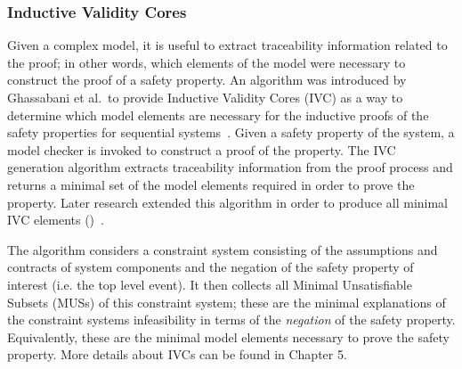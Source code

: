 \subsubsection{Inductive Validity Cores} Given a complex model, it is useful to extract traceability information related to the proof; in other words, which elements of the model were necessary to construct the proof of a safety property. An algorithm was introduced by Ghassabani et al.~to provide Inductive Validity Cores (IVC) as a way to determine which model elements are necessary for the inductive proofs of the safety properties for sequential systems~\cite{GhassabaniGW16}. Given a safety property of the system, a model checker is invoked to construct a proof of the property. The IVC generation algorithm extracts traceability information from the proof process and returns a minimal set of the model elements required in order to prove the property. Later research extended this algorithm in order to produce all minimal IVC elements (\aivcalg)~\cite{Ghassabani2017EfficientGO,bendik2018online}. 

The \aivcalg algorithm considers a constraint system consisting of the assumptions and contracts of system components and the negation of the safety property of interest (i.e. the top level event). It then collects all Minimal Unsatisfiable Subsets (MUSs) of this constraint system; these are the minimal explanations of the constraint systems infeasibility in terms of the \textit{negation} of the safety property. Equivalently, these are the minimal model elements necessary to prove the safety property. More details about IVCs can be found in Chapter 5.

 
